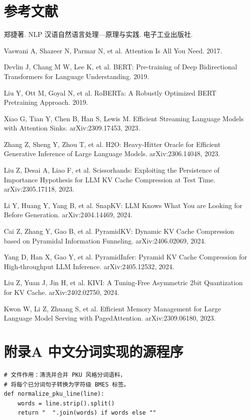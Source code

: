 \documentclass[12pt,a4paper,UTF8]{ctexart}
\newcommand{\xiaosi}{\fontsize{12pt}{18pt}\selectfont}
\newenvironment{reportbody}{\songti\xiaosi\onehalfspacing\sloppy}{}
\newenvironment{reportrefs}{%
  \begin{enumerate}[label={[\arabic*]}, leftmargin=3em, labelsep=0.7em, itemsep=6pt, topsep=0pt]
}{\end{enumerate}}
\begin{document}
\begin{reportbody}
\section*{参考文献}
{}
\begin{reportrefs}
  \item 郑捷著. NLP 汉语自然语言处理---原理与实践. 电子工业出版社.
  \item Vaswani A, Shazeer N, Parmar N, et al. Attention Is All You Need. 2017.
  \item Devlin J, Chang M W, Lee K, et al. BERT: Pre-training of Deep Bidirectional Transformers for Language Understanding. 2019.
  \item Liu Y, Ott M, Goyal N, et al. RoBERTa: A Robustly Optimized BERT Pretraining Approach. 2019.
  \item Xiao G, Tian Y, Chen B, Han S, Lewis M. Efficient Streaming Language Models with Attention Sinks. arXiv:2309.17453, 2023.
  \item Zhang Z, Sheng Y, Zhou T, et al. H2O: Heavy-Hitter Oracle for Efficient Generative Inference of Large Language Models. arXiv:2306.14048, 2023.
  \item Liu Z, Desai A, Liao F, et al. Scissorhands: Exploiting the Persistence of Importance Hypothesis for LLM KV Cache Compression at Test Time. arXiv:2305.17118, 2023.
  \item Li Y, Huang Y, Yang B, et al. SnapKV: LLM Knows What You are Looking for Before Generation. arXiv:2404.14469, 2024.
  \item Cai Z, Zhang Y, Gao B, et al. PyramidKV: Dynamic KV Cache Compression based on Pyramidal Information Funneling. arXiv:2406.02069, 2024.
  \item Yang D, Han X, Gao Y, et al. PyramidInfer: Pyramid KV Cache Compression for High-throughput LLM Inference. arXiv:2405.12532, 2024.
  \item Liu Z, Yuan J, Jin H, et al. KIVI: A Tuning-Free Asymmetric 2bit Quantization for KV Cache. arXiv:2402.02750, 2024.
  \item Kwon W, Li Z, Zhuang S, et al. Efficient Memory Management for Large Language Model Serving with PagedAttention. arXiv:2309.06180, 2023.
\end{reportrefs}

\clearpage
\section*{附录A 中文分词实现的源程序}
{}
\begin{lstlisting}[style=appendixcode, caption={data\_prepare.py：训练语料清洗合并与 BMES 标注}]
# 文件作用：清洗并合并 PKU 风格分词语料，
# 将每个已分词句子转换为字符级 BMES 标签。
def normalize_pku_line(line):
    words = line.strip().split()
    return "  ".join(words) if words else ""


\end{lstlisting}
\end{reportbody}
\end{document}
